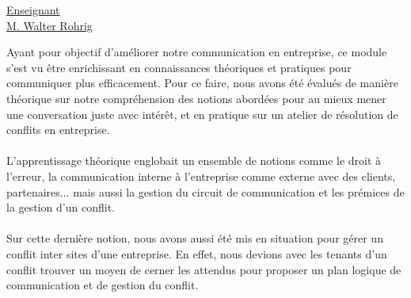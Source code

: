 \renewcommand{\figurename}{}

\vspace*{0.2cm}%
      \large
      \href{}{\color{black}Enseignant\\M. Walter Rohrig}\\
      \normalsize
\vspace*{0.5cm}%


Ayant pour objectif d'améliorer notre communication en entreprise, ce module s'est vu être enrichissant en connaissances théoriques et pratiques pour communiquer plus efficacement. Pour ce faire, nous avons été évalués de manière théorique sur notre compréhension des notions abordées pour au mieux mener une conversation juste avec intérêt, et en pratique sur un atelier de résolution de conflits en entreprise.
\\ \\
L'apprentissage théorique englobait un ensemble de notions comme le droit à l'erreur, la communication interne à l'entreprise comme externe avec des clients, partenaires... mais aussi la gestion du circuit de communication et les prémices de la gestion d'un conflit.
\\ \\
Sur cette dernière notion, nous avons aussi été mis en situation pour gérer un conflit inter sites d'une entreprise. En effet, nous devions avec les tenants d'un conflit trouver un moyen de cerner les attendus pour proposer un plan logique de communication et de gestion du conflit.